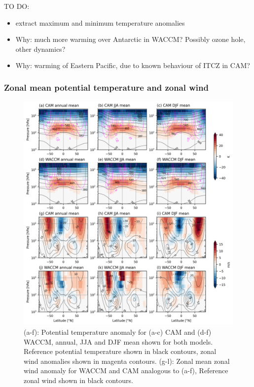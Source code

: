 TO DO:
\begin{itemize}
	\item extract maximum and minimum temperature anomalies
	\item Why: much more warming over Antarctic in WACCM? Possibly ozone hole, other dynamics?
	\item Why: warming of Eastern Pacific, due to known behaviour of ITCZ in CAM?
\end{itemize}

\subsubsection{Zonal mean potential temperature and zonal wind}

\begin{figure}[H]
	\centering
	\includegraphics[width=\linewidth]{../Paper_imgs/th_U_full.png}
	\caption{(a-f): Potential temperature anomaly for (a-c) CAM and (d-f) WACCM, annual, JJA and DJF mean shown for both models. Reference potential temperature shown in black contours, zonal wind anomalies shown in magenta contours. (g-l): Zonal mean zonal wind anomaly for WACCM and CAM analogous to (a-f), Reference zonal wind shown in black contours.}
	\label{fig:th_U}
\end{figure} 

